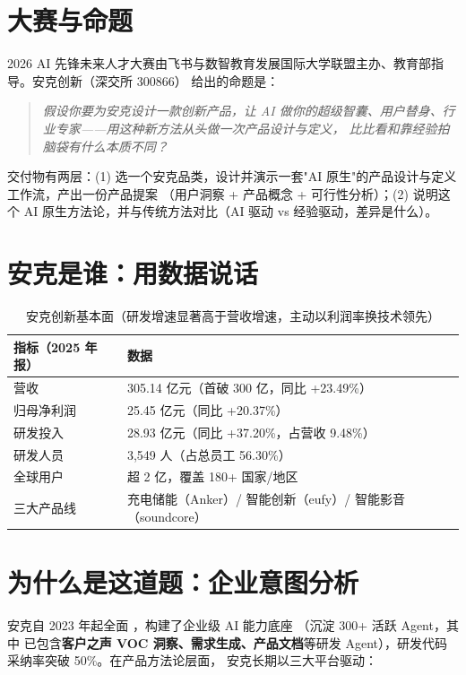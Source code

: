 \section{大赛与命题}

2026 AI 先锋未来人才大赛由飞书与数智教育发展国际大学联盟主办、教育部指导。安克创新（深交所 300866）
给出的命题是：

\begin{quote}\itshape
假设你要为安克设计一款创新产品，让 AI 做你的超级智囊、用户替身、行业专家——用这种新方法从头做一次产品设计与定义，
比比看和靠经验拍脑袋有什么本质不同？
\end{quote}

交付物有两层：(1) 选一个安克品类，设计并演示一套"AI 原生"的产品设计与定义工作流，产出一份产品提案
（用户洞察 + 产品概念 + 可行性分析）；(2) 说明这个 AI 原生方法论，并与传统方法对比（AI 驱动 vs 经验驱动，差异是什么）。

\section{安克是谁：用数据说话}

\begin{table}[h]\centering\small
\renewcommand{\arraystretch}{1.25}
\begin{tabularx}{\linewidth}{p{4.6cm} X}
\toprule
\textbf{指标（2025 年报）} & \textbf{数据} \\
\midrule
营收 & 305.14 亿元（首破 300 亿，同比 +23.49\%） \\
归母净利润 & 25.45 亿元（同比 +20.37\%） \\
研发投入 & 28.93 亿元（同比 +37.20\%，占营收 9.48\%） \\
研发人员 & 3{,}549 人（占总员工 56.30\%） \\
全球用户 & 超 2 亿，覆盖 180+ 国家/地区 \\
三大产品线 & 充电储能（Anker）/ 智能创新（eufy）/ 智能影音（soundcore） \\
\bottomrule
\end{tabularx}
\caption{安克创新基本面（研发增速显著高于营收增速，主动以利润率换技术领先）}
\end{table}

\section{为什么是这道题：企业意图分析}

安克自 2023 年起全面 ，构建了企业级 AI 能力底座 （沉淀 300+ 活跃 Agent，其中
已包含\textbf{客户之声 VOC 洞察、需求生成、产品文档}等研发 Agent），研发代码采纳率突破 50\%。在产品方法论层面，
安克长期以三大平台驱动：

